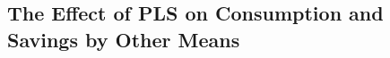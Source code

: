 \documentclass[12pt]{article}
\begin{document}
		\clearpage

	







	\subsection{The Effect of PLS on Consumption and Savings by Other Means}
\end{document}
